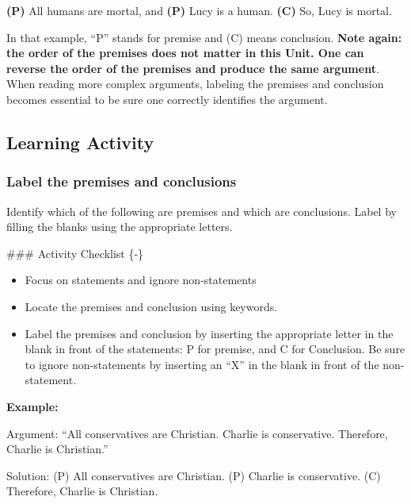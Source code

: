 \documentclass[
]{book}
\begin{document}
\textbf{(P)} All humans are mortal, and \textbf{(P)} Lucy is a human. \textbf{(C)} So, Lucy is mortal.

In that example, ``P'' stands for premise and (C) means conclusion. \textbf{Note again: the order of the premises does not matter in this Unit. One can reverse the order of the premises and produce the same argument}. When reading more complex arguments, labeling the premises and conclusion becomes essential to be sure one correctly identifies the argument.

\hypertarget{learning-activity-1}{%
\subsection*{Learning Activity}\label{learning-activity-1}}

\begin{reflect}
\hypertarget{label-the-premises-and-conclusions}{%
\subsubsection{Label the premises and conclusions}\label{label-the-premises-and-conclusions}}

Identify which of the following are premises and which are conclusions. Label by filling the blanks using the appropriate letters.
\end{reflect}
\#\#\# Activity Checklist \{-\}

\begin{progress}
\begin{itemize}
\item
  Focus on statements and ignore non-statements
\item
  Locate the premises and conclusion using keywords.
\item
  Label the premises and conclusion by inserting the appropriate letter in the blank in front of the statements: P for premise, and C for Conclusion. Be sure to ignore non-statements by inserting an ``X'' in the blank in front of the non-statement.
\end{itemize}
\end{progress}

\textbf{Example:}

Argument:
``All conservatives are Christian. Charlie is conservative. Therefore, Charlie is Christian.''

Solution:
(P) All conservatives are Christian. (P) Charlie is conservative. (C) Therefore, Charlie is Christian.
\end{document}
